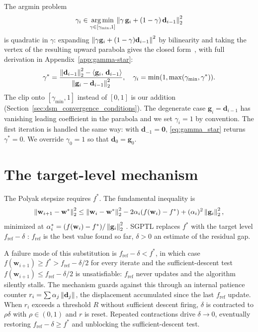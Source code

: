 The argmin problem
\begin{equation}\label{eq:gamma_opt}
\gamma_i \in \argmin_{\gamma \in [\gamma_{\min},1]} \norm{\gamma\, \mathbf{g}_i + (1-\gamma)\, \mathbf{d}_{i-1}}_2^2
\end{equation}
is quadratic in $\gamma$: expanding $\left\lVert \gamma\mathbf{g}_i + (1-\gamma)\mathbf{d}_{i-1} \right\rVert^2$ by bilinearity and taking the vertex of the resulting upward parabola gives the closed form~\cite[Slide 15]{frangioni-slides-nonsmooth}, with full derivation in Appendix~\ref{app:gamma-star}:
\begin{equation}\label{eq:gamma_star}
\gamma^* = \frac{\left\lVert \mathbf{d}_{i-1} \right\rVert_2^2 - \left\langle \mathbf{g}_i,\, \mathbf{d}_{i-1} \right\rangle}{\left\lVert \mathbf{g}_i - \mathbf{d}_{i-1} \right\rVert_2^2}, \quad \gamma_i = \min(1,\max(\gamma_{\min},\gamma^*)).
\end{equation}
The clip onto $[\gamma_{\min}, 1]$ instead of $[0, 1]$ is our addition (Section~\ref{sec:dsm_convergence_conditions}). The degenerate case $\mathbf{g}_i = \mathbf{d}_{i-1}$ has vanishing leading coefficient in the parabola and we set $\gamma_i = 1$ by convention. The first iteration is handled the same way: with $\mathbf{d}_{-1} = \mathbf{0}$, \eqref{eq:gamma_star} returns $\gamma^* = 0$. We override $\gamma_0 = 1$ so that $\mathbf{d}_0 = \mathbf{g}_0$.

\section{The target-level mechanism}
\label{sec:dsm_target_level}

The Polyak stepsize \cite[Slide 12]{frangioni-slides-nonsmooth} requires $f^*$. The fundamental inequality \cite[Slide 10]{frangioni-slides-nonsmooth} is
\begin{equation}\label{eq:fundamental}
\left\lVert \mathbf{w}_{i+1}-\mathbf{w}^* \right\rVert_2^2 \leq \left\lVert \mathbf{w}_i-\mathbf{w}^* \right\rVert_2^2 - 2\alpha_i(f(\mathbf{w}_i)-f^*) + (\alpha_i)^2\left\lVert \mathbf{g}_i \right\rVert_2^2,
\end{equation}
minimized at $\alpha_i^* = (f(\mathbf{w}_i)-f^*)/\left\lVert \mathbf{g}_i \right\rVert_2^2$ \cite[Slide 12]{frangioni-slides-nonsmooth}. SGPTL replaces $f^*$ with the target level $f_{\mathrm{ref}} - \delta$ \cite[Slide 14]{frangioni-slides-nonsmooth}: $f_{\mathrm{ref}}$ is the best value found so far, $\delta > 0$ an estimate of the residual gap.

A failure mode of this substitution is $f_{\mathrm{ref}} - \delta < f^*$, in which case $f(\mathbf{w}_{i+1}) \ge f^* > f_{\mathrm{ref}} - \delta/2$ for every iterate and the sufficient-descent test $f(\mathbf{w}_{i+1}) \le f_{\mathrm{ref}} - \delta/2$ is unsatisfiable: $f_{\mathrm{ref}}$ never updates and the algorithm silently stalls. The mechanism guards against this through an internal patience counter $r_i = \sum \alpha_j \left\lVert \mathbf{d}_j \right\rVert$, the displacement accumulated since the last $f_{\mathrm{ref}}$ update. When $r_i$ exceeds a threshold $R$ without sufficient descent firing, $\delta$ is contracted to $\rho\delta$ with $\rho \in (0,1)$ and $r$ is reset. Repeated contractions drive $\delta \to 0$, eventually restoring $f_{\mathrm{ref}} - \delta \ge f^*$ and unblocking the sufficient-descent test.

